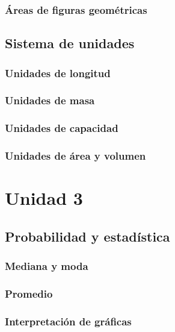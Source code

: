 \documentclass[12pt,addpoints,answers]{evalua}
\begin{document}
\begin{questions}
	\subsubsection{Áreas de figuras geométricas}
	\question[1]{}
	\subsection   {Sistema de unidades}
	\subsubsection{Unidades de longitud}
	\question[1]{}
	\subsubsection{Unidades de masa}
	\question[1]{}
	\subsubsection{Unidades de capacidad}
	\question[1]{}
	\subsubsection{Unidades de área y volumen}
	\question[1]{}

	\section{Unidad 3}
	\subsection   {Probabilidad y estadística}
	\subsubsection{Mediana y moda}
	\question[1]{}
	\subsubsection{Promedio}
	\question[1]{}
	\subsubsection{Interpretación de gráficas}
	\question[1]{}

\end{questions}
\end{document}
